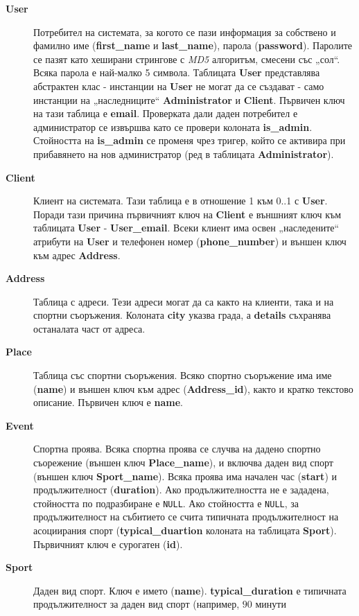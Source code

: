 \documentclass[a4paper,10pt, leqno]{article}
\newcommand{\term}[1] {\textsl{#1}}
\newcommand{\tab}[1] {\textbf{#1}}
\newcommand{\col}[1] {\textbf{#1}}
\begin{document}
\begin{description}
    \item[\tab{User}]
        Потребител на системата, за когото се пази информация за собствено и фамилно име (\col{first\_name} и \col{last\_name}),
        парола (\col{password}). Паролите се пазят като хеширани стрингове с \term{MD5} алгоритъм, смесени със „сол“. Всяка парола
        е най-малко 5 символа. Таблицата \tab{User} представлява абстрактен клас - инстанции на \tab{User} не могат да се създават -
        само инстанции на „наследниците“ \tab{Administrator} и \tab{Client}.
        Първичен ключ на тази таблица е \tab{email}.
        Проверката дали даден потребител е администратор се извършва като се провери колоната \col{is\_admin}. Стойността на \col{is\_admin}
        се променя чрез тригер, който се активира при прибавянето на нов администратор (ред в таблицата \tab{Administrator}).
    \item[\tab{Client}]
        Клиент на системата. Тази таблица е в отношение 1 към 0..1 с \tab{User}. Поради тази причина първичният ключ на \tab{Client} е
        външният ключ към таблицата \tab{User} - \tab{User\_email}. Всеки клиент има освен „наследените“ атрибути на \tab{User} и
        телефонен номер (\col{phone\_number}) и външен ключ към адрес \tab{Address}.
    \item[\tab{Address}]
        Таблица с адреси. Тези адреси могат да са както на клиенти, така и на спортни съоръжения. Колоната \col{city} указва града,
        а \col{details} съхранява останалата част от адреса.
    \item[\tab{Place}]
        Таблица със спортни съоръжения. Всяко спортно съоръжение има име (\col{name}) и външен ключ към адрес (\col{Address\_id}), както и
        кратко текстово описание. Първичен ключ е \col{name}.
    \item[\tab{Event}]
        Спортна проява. Всяка спортна проява се случва на дадено спортно съорежение (външен ключ \col{Place\_name}), и включва даден
        вид спорт (външен ключ \col{Sport\_name}). Всяка проява има начален час (\col{start}) и продължителност (\col{duration}). Ако 
        продължителността не е зададена, стойността по подразбиране е \texttt{NULL}. Ако стойността е \texttt{NULL}, за продължителност
        на събитието се счита типичната продължителност на асоциирания спорт (\col{typical\_duartion} колоната на таблицата \col{Sport}).
        Първичният ключ е сурогатен (\col{id}).
    \item[\tab{Sport}]
        Даден вид спорт. Ключ е името (\col{name}). \col{typical\_duration} е типичната продължителност за даден вид спорт (например, $90$ минути

\end{description}
\end{document}
